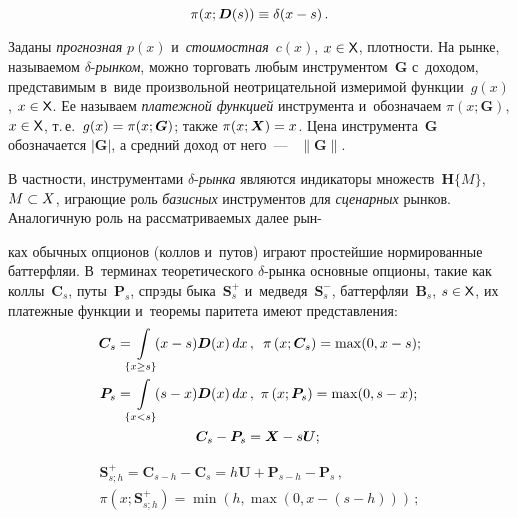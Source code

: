 \begin{multicols}{2}
\vspace*{-3pt}

\noindent
$$
\pi(x;  \boldsymbol{D}(s))\hm\equiv \delta (x\hm-s)\,. 
$$

\vspace*{-3pt}
  
  Заданы \textit{прогнозная} $p(x)$ и~\textit{стоимостная}~$c(x)$, $x\hm\in 
{\sf X}$, плотности. На рынке, называемом $\delta$-\textit{рын\-ком}, можно 
торговать любым инструментом~$\boldsymbol{G}$ с~доходом, представимым 
в~виде произвольной неотрицательной измеримой функции~$g(x)$, $x\hm\in 
{\sf X}$. Ее называем \textit{платежной функцией} инструмента и~обозначаем 
$\pi (x; \boldsymbol{G})$, $x\hm\in {\sf X}$, т.\,е.\ $g(x) \hm= \pi(x; \boldsymbol{G})$; 
также $\pi(x; \boldsymbol{X}) \hm= x$. Цена инструмента~$\boldsymbol{G}$ 
обозначается $\vert\boldsymbol{G}\vert$, а средний доход от него~---
~$\|\boldsymbol{G}\|$. 
  
  В частности, инструментами $\delta$-\textit{рын\-ка} являются индикаторы 
множеств~$\boldsymbol{H}\{M\}$, $M\hm\subset {X}$, играющие роль 
\textit{базисных} инструментов для \textit{сценарных} рынков.
 Аналогичную 
роль на рассматриваемых далее рын-\linebreak\vspace*{-12pt}

\pagebreak

\noindent
ках обычных опционов (коллов и~путов) 
играют простейшие нормированные баттерфляи. В~терминах теоретического 
$\delta$-рын\-ка основные опционы, такие как коллы~$\boldsymbol{C}_s$, 
путы~$\boldsymbol{P}_s$, спрэды быка~$\boldsymbol{S}_s^+$ 
и~медведя~$\boldsymbol{S}_s^-$, баттерфляи~$\boldsymbol{B}_s$, $s\hm\in {\sf 
X}$, их платежные функции и~теоремы паритета имеют представления: 
  \begin{align*}
  \boldsymbol{C}_s&=\!\!\!\int\limits_{\{x\geq s\}}\! \!(x-s) \boldsymbol{D}(x)\,dx\,,\enskip 
  \pi\left(x; \boldsymbol{C}_s\right) = \max (0, x-s);\\
  \boldsymbol{P}_s&=\!\!\!\int\limits_{\{x<s\}}\!\! (s-x) \boldsymbol{D}(x)\,dx\,,\ \pi\left(x; 
\boldsymbol{P}_s\right) =\max(0, s-x);\\
&\hspace*{20mm}\boldsymbol{C}_s-\boldsymbol{P}_s=\boldsymbol{X}-s\boldsymbol{U};
  \end{align*}
  
  \vspace*{-12pt}
  
  \noindent
  \begin{multline}
  \boldsymbol{S}^+_{s;h} =\boldsymbol{C}_{s-h}- \boldsymbol{C}_s 
=h\boldsymbol{U} +\boldsymbol{P}_{s-h} -\boldsymbol{P}_s\,,\\
  \pi\left( x; \boldsymbol{S}^+_{s;h} \right)= \min \left( h,\max \left( 0,x-(s-
h)\right)\right)\,;
\label{e1-aga}
\end{multline}
\ \vspace*{-12pt}
  

\end{multicols}
